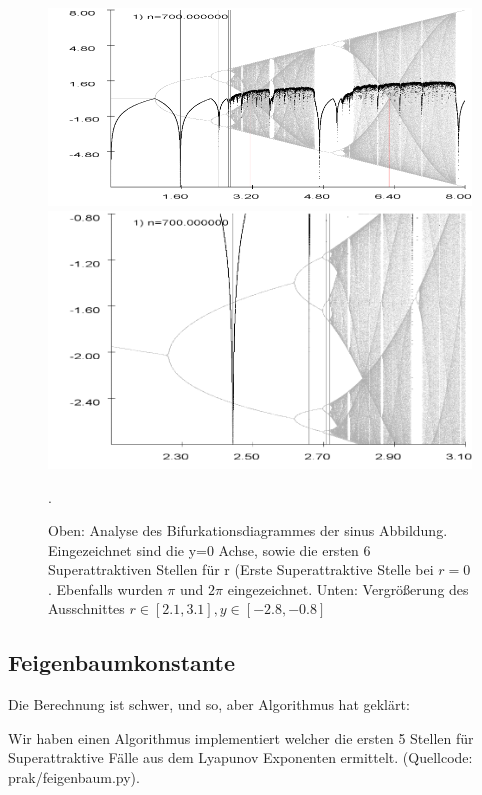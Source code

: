 \documentclass{scrartcl}
\begin{document}
\begin{figure}
\centering
\includegraphics[scale=0.55]{bifurkation-sin}
\includegraphics[scale=0.47]{bifurkation-sin-zoom}
\caption{Oben: Analyse des Bifurkationsdiagrammes der sinus Abbildung. Eingezeichnet sind die y=0 Achse, sowie die ersten 6 Superattraktiven Stellen für r (Erste Superattraktive Stelle bei $r=0$. Ebenfalls wurden $\pi$ und $2\pi$ eingezeichnet. Unten: Vergrößerung des Ausschnittes $r \in [2.1,3.1], y\in[-2.8,-0.8]$}. 
\end{figure}


\subsection{Feigenbaumkonstante}
Die Berechnung ist schwer, und so, aber Algorithmus hat geklärt:

Wir haben einen Algorithmus implementiert welcher die ersten 5 Stellen für Superattraktive Fälle aus dem Lyapunov Exponenten ermittelt. (Quellcode: prak/feigenbaum.py). 
       
\end{document}
